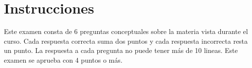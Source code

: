 
\section*{Instrucciones}

Este examen consta de 6 preguntas conceptuales sobre la materia vista durante el curso. Cada respuesta correcta suma dos puntos y cada respuesta incorrecta resta un punto. La respuesta a cada pregunta no puede tener más de 10 lineas. 
Este examen se aprueba con 4 puntos o más.
